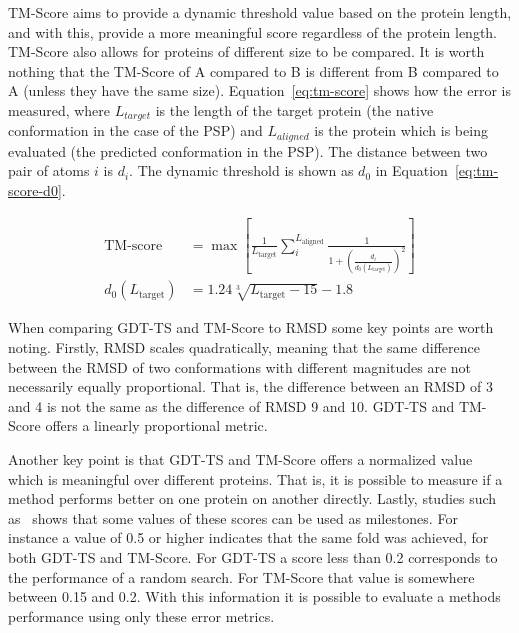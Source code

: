 \ac{TM-Score} aims to provide a dynamic threshold value based on the protein
length, and with this, provide a more meaningful score regardless of the
protein length. \ac{TM-Score} also allows for proteins of different size to be
compared. It is worth nothing that the \ac{TM-Score} of A compared to B is
different from B compared to A (unless they have the same size).
Equation~\eqref{eq:tm-score} shows how the error is measured, where
$L_{target}$ is the length of the target protein (the native conformation in
the case of the \ac{PSP}) and $L_{aligned}$ is the protein which is being
evaluated (the predicted conformation in the \ac{PSP}). The distance between
two pair of atoms $i$ is $d_i$. The dynamic threshold is shown as $d_0$ in
Equation~\eqref{eq:tm-score-d0}.


\begin{align}
    \text{TM-score}&=\max\left[ \frac{1}{L_\text{target}}\sum_i^{L_\text{aligned}}\frac{1}{1+\left(\frac{d_i}{d_0(L_\text{target})}\right)^2} \right] \label{eq:tm-score} \\
    d_0(L_\text{target})&=1.24\sqrt[3]{L_\text{target}-15}-1.8 \label{eq:tm-score-d0}
\end{align}

When comparing \ac{GDT-TS} and \ac{TM-Score} to \ac{RMSD} some key points are
worth noting. Firstly, \ac{RMSD} scales quadratically, meaning that the same
difference between the \ac{RMSD} of two conformations with different magnitudes
are not necessarily equally proportional. That is, the difference between
an RMSD of 3 and 4 is not the same as the difference of RMSD 9 and 10.
\ac{GDT-TS} and \ac{TM-Score} offers a linearly proportional metric.

Another
key point is that \ac{GDT-TS} and \ac{TM-Score} offers a normalized value which
is meaningful over different proteins. That is, it is possible to measure if a
method performs better on one protein on another directly. Lastly, studies such
as~\cite{xu2010significant} shows that some values of these scores can be used
as milestones. For instance a value of 0.5 or higher indicates that the same
fold was achieved, for both GDT-TS and TM-Score.
For \ac{GDT-TS} a score less than 0.2 corresponds to the
performance of a random search. For \ac{TM-Score} that value is somewhere
between 0.15 and 0.2. With this information it is possible to evaluate a
methods performance using only these error metrics.

